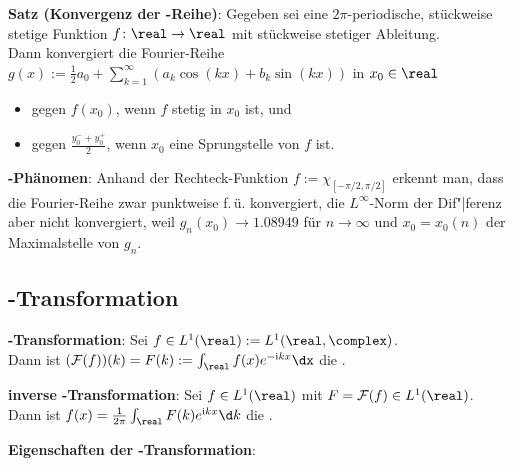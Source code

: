 \textbf{Satz (Konvergenz der -Reihe)}:
Gegeben sei eine $2\pi$-periodische, stückweise stetige Funktion $f\colon \real \to \real$
mit stückweise stetiger Ableitung.\\
Dann konvergiert die Fourier-Reihe
$g(x) := \frac{1}{2} a_0 + \sum_{k=1}^\infty (a_k\cos(kx) + b_k\sin(kx))$ in $x_0 \in \real$
\begin{itemize}
    \item
    gegen $f(x_0)$, wenn $f$ stetig in $x_0$ ist, und
    
    \item
    gegen $\frac{y_0^- + y_0^+}{2}$, wenn $x_0$ eine Sprungstelle von $f$ ist.
\end{itemize}

\textbf{-Phänomen}:
Anhand der Rechteck-Funktion $f := \chi_{[-\pi/2,\pi/2]}$ erkennt man,
dass die Fourier-Reihe zwar punktweise f.\,ü. konvergiert,
die $L^\infty$-Norm der Dif"|ferenz aber nicht konvergiert,
weil $g_n(x_0) \to 1.08949$ für $n \to \infty$ und $x_0 = x_0(n)$ der Maximalstelle von $g_n$.

\pagebreak

\subsection{%
    -Transformation%
}

\textbf{-Transformation}:
Sei $f \in L^1(\real) := L^1(\real, \complex)$.\\
Dann ist $(\F(f))(k) = F(k) := \int_\real f(x)e^{-\iu kx} \dx$
die .

\textbf{inverse -Transformation}:
Sei $f \in L^1(\real)$ mit $F = \F(f) \in L^1(\real)$.\\
Dann ist $f(x) = \frac{1}{2\pi} \int_\real F(k) e^{\iu kx}\d k$ die
.

\textbf{Eigenschaften der -Transformation}:

